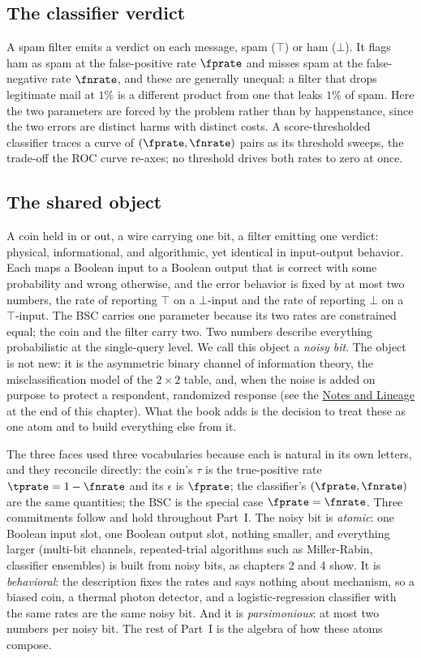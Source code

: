\subsection*{The classifier verdict}

A spam filter emits a verdict on each message, spam ($\top$) or ham ($\bot$).
It flags ham as spam at the false-positive rate $\fprate$ and misses spam at
the false-negative rate $\fnrate$, and these are generally unequal: a filter
that drops legitimate mail at $1\%$ is a different product from one that leaks
$1\%$ of spam. Here the two parameters are forced by the problem rather than by
happenstance, since the two errors are distinct harms with distinct costs. A
score-thresholded classifier traces a curve of $(\fprate, \fnrate)$ pairs as
its threshold sweeps, the trade-off the ROC curve re-axes; no threshold drives
both rates to zero at once.

\subsection*{The shared object}

A coin held in or out, a wire carrying one bit, a filter emitting one verdict:
physical, informational, and algorithmic, yet identical in input-output
behavior. Each maps a Boolean input to a Boolean output that is correct with
some probability and wrong otherwise, and the error behavior is fixed by at
most two numbers, the rate of reporting $\top$ on a $\bot$-input and the rate
of reporting $\bot$ on a $\top$-input. The BSC carries one parameter because
its two rates are constrained equal; the coin and the filter carry two. Two
numbers describe everything probabilistic at the single-query level. We call
this object a \emph{noisy bit}. The object is not new: it is
the asymmetric binary channel of information theory, the misclassification
model of the $2 \times 2$ table, and, when the noise is added on purpose to
protect a respondent, randomized response
(see the \hyperref[sec:bib-notes-ch1]{Notes and Lineage} at the end of this
chapter). What the book adds is the decision to treat these as
one atom and to build everything else from it.

The three faces used three vocabularies because each is natural in its own
letters, and they reconcile directly: the coin's $\tau$ is the true-positive
rate $\tprate = 1 - \fnrate$ and its $\epsilon$ is $\fprate$; the classifier's
$(\fprate, \fnrate)$ are the same quantities; the BSC is the special case
$\fprate = \fnrate$. Three commitments follow and hold throughout Part~I. The
noisy bit is \emph{atomic}: one Boolean input slot, one Boolean output slot,
nothing smaller, and everything larger (multi-bit channels, repeated-trial
algorithms such as Miller-Rabin, classifier ensembles) is built from noisy
bits, as chapters 2 and 4 show. It is \emph{behavioral}: the description fixes
the rates and says nothing about mechanism, so a biased coin, a thermal photon
detector, and a logistic-regression classifier with the same rates are the
same noisy bit. And it is \emph{parsimonious}: at most two numbers per noisy
bit. The rest of Part~I is the algebra of how these atoms compose.
